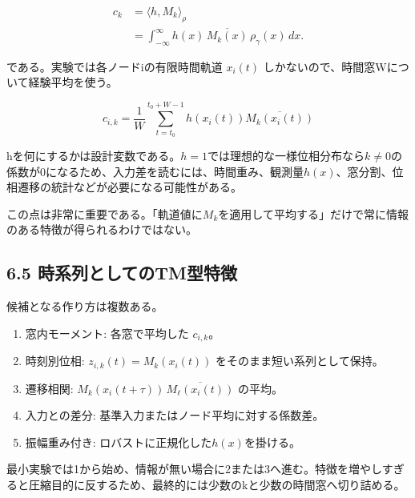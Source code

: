 \documentclass[11pt,a4paper]{ltjsarticle}
\begin{document}
\[
\begin{aligned}
c_k&=\langle h,M_k\rangle_{\rho}\\
&=\int_{-\infty}^{\infty}h(x)\,\overline{M_k(x)}\,\rho_{\gamma}(x)\,dx.
\end{aligned}
\]

である。実験では各ノードiの有限時間軌道 \(x_i(t)\) しかないので、時間窓Wについて経験平均を使う。\par

\[
c_{i,k}=\frac{1}{W}\sum_{t=t_0}^{t_0+W-1}h\!\left(x_i(t)\right)\overline{M_k\!\left(x_i(t)\right)}
\]

hを何にするかは設計変数である。\(h=1\)では理想的な一様位相分布なら\(k\ne0\)の係数が0になるため、入力差を読むには、時間重み、観測量\(h(x)\)、窓分割、位相遷移の統計などが必要になる可能性がある。\par

この点は非常に重要である。「軌道値に\(M_k\)を適用して平均する」だけで常に情報のある特徴が得られるわけではない。\par

\subsection*{\textcolor{researchblue}{6.5 時系列としてのTM型特徴}}

候補となる作り方は複数ある。\par

\begin{enumerate}

\item 窓内モーメント: 各窓で平均した \(c_{i,k}\)。

\item 時刻別位相: \(z_{i,k}(t)=M_k(x_i(t))\) をそのまま短い系列として保持。

\item 遷移相関: \(M_k(x_i(t+\tau))\,\overline{M_{\ell}(x_i(t))}\) の平均。

\item 入力との差分: 基準入力またはノード平均に対する係数差。

\item 振幅重み付き: ロバストに正規化した\(h(x)\)を掛ける。

\end{enumerate}

最小実験では1から始め、情報が無い場合に2または3へ進む。特徴を増やしすぎると圧縮目的に反するため、最終的には少数のkと少数の時間窓へ切り詰める。\par
\end{document}
